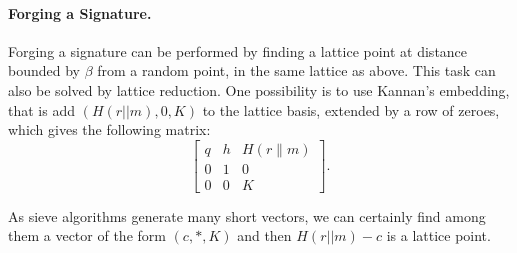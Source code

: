 \paragraph{Forging a Signature.} Forging a signature can be performed by finding a lattice point at distance bounded by $\beta$ from a random point, in the same lattice as above.
This task can also be solved by lattice reduction.
One possibility is to use Kannan's embedding, that is add $(H(r||m), 0, K)$ to the lattice basis,
extended by a row of zeroes, which gives the following matrix:
\[ \left[
\begin{array}{c|c|c}
q  & h & H(r\| m) \\
\hline
0 & 1 & 0 \\
\hline
0 & 0 & K
\end{array}
\right].
\]

\iffalse
$(2n+1) \times (2n+1)$ matrix:
%
\newcommand{\toto}[1]{\multicolumn{3}{c|}{\multirow{3}{*}{#1}}}
\[
\renewcommand{\arraycolsep}{2.5mm}
\left[
\begin{array}{ccc|ccc|c}
\toto{$\matI_n$} & \toto{$0$} & \multirow{3}{*}{0}\\
&&&&&& \\
&&&&&& \\
\hline
\toto{$\cC(h)$} & \toto{$q \matI_n$} & \multirow{3}{*}{0}\\
&&&&&& \\
&&&&&& \\
\hline
\multicolumn{3}{c|}{H(\salt \| \msg)} & \multicolumn{3}{c|}{0} & 1
\end{array}
\right],
\]
where $\cC(h)$ is the $n \times n$ matrix which $i$-th row is the vector of coefficients of $x^{i-1} \cdot h \bmod (x^n + 1)$.
\fi
%

As sieve algorithms generate many short vectors, we can certainly find among them a vector of the
form $(c,*, K)$ and then $H(r||m)-c$ is a lattice point.

